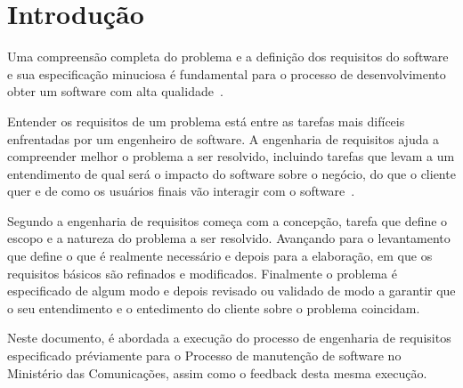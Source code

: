\chapter[Introdução]{Introdução}

Uma compreensão completa do problema e a definição dos requisitos do software e sua especificação minuciosa é fundamental para o processo de desenvolvimento obter um software com alta qualidade~\cite{sommerville2007}.

Entender os requisitos de um problema está entre as tarefas mais difíceis enfrentadas por um engenheiro de software. A engenharia de requisitos ajuda a compreender melhor o problema a ser resolvido, incluindo tarefas que levam a um entendimento de qual será o impacto do software sobre o negócio, do que o cliente quer e de como os usuários finais vão interagir com o software~\cite{ariadne2001}.

Segundo \cite{pressman2011} a engenharia de requisitos começa com a concepção, tarefa que define o escopo e a natureza do problema a ser resolvido. Avançando para o levantamento que define o que é realmente necessário e depois para a elaboração, em que os requisitos básicos são refinados e modificados. Finalmente o problema é especificado de algum modo e depois revisado ou validado de modo a garantir que o seu entendimento e o entedimento do cliente sobre o problema coincidam.

Neste documento, é abordada a execução do processo de engenharia de requisitos especificado préviamente para o Processo de manutenção de software no Ministério das Comunicações, assim como o feedback desta mesma execução.
